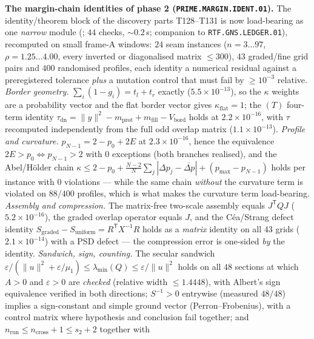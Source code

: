 \par\smallskip\noindent\textbf{The margin-chain identities of phase 2
(\texttt{PRIME.MARGIN.IDENT.01}).}
The identity/theorem block of the discovery parts T128--T131 is now load-bearing
as one \emph{narrow} module (; $44$
checks, ${\sim}0.2$\,s; companion to \texttt{RTF.GNS.LEDGER.01}), recomputed on
small frame-A windows: $24$ seam instances ($n=3\ldots97$,
$\rho=1.25\ldots4.00$, every inverted or diagonalised matrix $\le300$), $43$
graded/fine grid pairs and $400$ randomised profiles, each identity a numerical
residual against a preregistered tolerance \emph{plus} a mutation control that
must fail by $\ge10^{-3}$ relative.
\emph{Border geometry.} $\sum_i(1-g_i)=t_l+t_r$ exactly
($5.5\times10^{-13}$), so the $\kappa$ weights are a probability vector and the
flat border vector gives $\kappa_{\mathrm{flat}}=1$; the $(T)$ four-term
identity $\tau_{\mathrm{dn}}=\|y\|^2-m_{\mathrm{prot}}+m_{\mathrm{fill}}-V_{\mathrm{bord}}$
holds at $2.2\times10^{-16}$, with $\tau$ recomputed independently from the full
odd overlap matrix ($1.1\times10^{-13}$).
\emph{Profile and curvature.} $p_{N-1}=2-p_0+2E$ at $2.3\times10^{-16}$, hence
the equivalence $2E>p_0\iff p_{N-1}>2$ with $0$ exceptions (both branches
realised), and the Abel/H\"older chain
$\kappa\le2-p_0+\frac{N-2}{N}\sum_j|\Delta p_j-\overline{\Delta p}|+(p_{\max}-p_{N-1})$
holds per instance with $0$ violations --- while the same chain \emph{without}
the curvature term is violated on $88/400$ profiles, which is what makes the
curvature term load-bearing.
\emph{Assembly and compression.} The matrix-free two-scale assembly equals
$J^{\mathsf T}QJ$ ($5.2\times10^{-16}$), the graded overlap operator equals $J$,
and the C\'ea/Strang defect identity
$S_{\mathrm{graded}}-S_{\mathrm{uniform}}=R^{\mathsf T}X^{-1}R$ holds as a
\emph{matrix} identity on all $43$ grids ($2.1\times10^{-14}$) with a PSD defect
--- the compression error is one-sided \emph{by} the identity.
\emph{Sandwich, sign, counting.} The secular sandwich
$\varepsilon/(\|u\|^2+\varepsilon/\mu_1)\le\lambda_{\min}(Q)\le\varepsilon/\|u\|^2$
holds on all $48$ sections at which $A>0$ and $\varepsilon>0$ are \emph{checked}
(relative width $\le1.4448$), with Albert's sign equivalence verified in both
directions; $S^{-1}>0$ entrywise (measured $48/48$) implies a sign-constant and
simple ground vector (Perron--Frobenius), with a control matrix where hypothesis
and conclusion fail together; and
$n_{\mathrm{run}}\le n_{\mathrm{cross}}+1\le s_2+2$ together with
